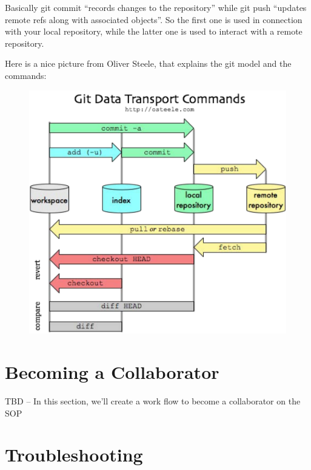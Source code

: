 \documentclass[12pt]{../SOP3_beta}
\begin{document}
\begin{description}
  
Basically git commit ``records changes to the repository'' while git push ``updates remote refs along with associated objects''. So the first one is used in connection with your local repository, while the latter one is used to interact with a remote repository.

Here is a nice picture from Oliver Steele, that explains the git model and the commands:  

\begin{figure}
\includegraphics{graphics/MgaV9}
\end{figure}
   
\end{description}

\section{Becoming a Collaborator}

TBD -- In this section, we'll create a work flow to become a collaborator on the SOP

\section{Troubleshooting}
\end{document}
